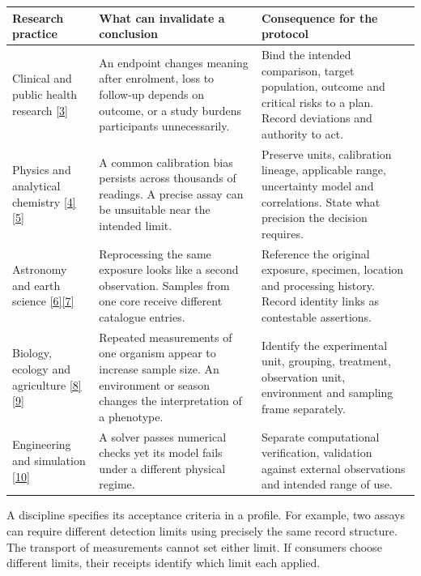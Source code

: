 \documentclass[11pt,a4paper]{article}
\newcommand{\topic}[1]{\par\smallskip{\sffamily\bfseries\color{ink}#1\par}\nobreak}
\newcommand{\src}[1]{\hyperlink{ref#1}{[#1]}}
\begin{document}
\small
\begin{tabularx}{\linewidth}{@{}L{.225\linewidth}YY@{}}
\toprule
\textbf{Research practice} & \textbf{What can invalidate a conclusion} & \textbf{Consequence for the protocol} \\ \midrule
Clinical and public health research \src{3} & An endpoint changes meaning after enrolment, loss to follow-up depends on outcome, or a study burdens participants unnecessarily. & Bind the intended comparison, target population, outcome and critical risks to a plan. Record deviations and authority to act. \\
Physics and analytical chemistry \src{4}\src{5} & A common calibration bias persists across thousands of readings. A precise assay can be unsuitable near the intended limit. & Preserve units, calibration lineage, applicable range, uncertainty model and correlations. State what precision the decision requires. \\
Astronomy and earth science \src{6}\src{7} & Reprocessing the same exposure looks like a second observation. Samples from one core receive different catalogue entries. & Reference the original exposure, specimen, location and processing history. Record identity links as contestable assertions. \\
Biology, ecology and agriculture \src{8}\src{9} & Repeated measurements of one organism appear to increase sample size. An environment or season changes the interpretation of a phenotype. & Identify the experimental unit, grouping, treatment, observation unit, environment and sampling frame separately. \\
Engineering and simulation \src{10} & A solver passes numerical checks yet its model fails under a different physical regime. & Separate computational verification, validation against external observations and intended range of use. \\
\bottomrule
\end{tabularx}
\normalsize

\topic{Which decisions belong to the discipline}
A discipline specifies its acceptance criteria in a profile. For example, two assays can require different detection limits using precisely the same record structure. The transport of measurements cannot set either limit. If consumers choose different limits, their receipts identify which limit each applied.
\end{document}
